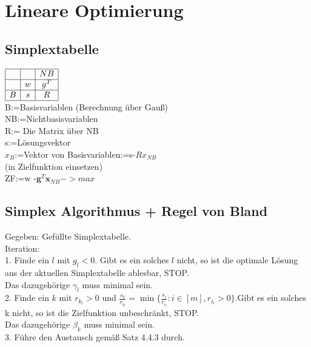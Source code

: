 \documentclass[]{article}
\begin{document}
\section{Lineare Optimierung}
\subsection{Simplextabelle}
$\begin{array}{|c|c|c|}
\hline
&  & NB \\
\hline
& w & g^T \\
\hline
B  & s & R\\
\hline
\end{array}
$
\\
B:=Basisvariablen (Berechnung über Gauß)\\
NB:=Nichtbasisvariablen\\
R:= Die Matrix über NB \\
s:=Lösungsvektor\\
$x_B$:=Vektor von Basisvariablen:=s-$Rx_{NB}$\\ (in Zielfunktion einsetzen)\\
ZF:=w -$\mathbf{g}^T\mathbf{x}_{NB}->max$

\subsection{Simplex Algorithmus + Regel von Bland}
Gegeben: Gefüllte Simplextabelle.\\
Iteration:\\
1. Finde ein $ l $ mit $ g_l < 0 $. Gibt es ein solches $ l $ nicht, so ist die optimale
Lösung aus der aktuellen Simplextabelle ablesbar, STOP.\\Das dazugehörige $ \gamma_l $ muss minimal sein.\\
2. Finde ein $ k $ mit $ r_{k_l} >0 $ und $ \frac{s_k}{r_{l_k}}  =\min\{\frac{s_i}{r_{i_l}} :i\in [m],r_{i_l} >0\} $.Gibt es ein solches k nicht, so ist die Zielfunktion unbeschränkt, STOP. \\Das dazugehörige $ \beta_k $ muss minimal sein.\\
3. Führe den Austausch gemäß Satz 4.4.3 durch.\\
\end{document}
